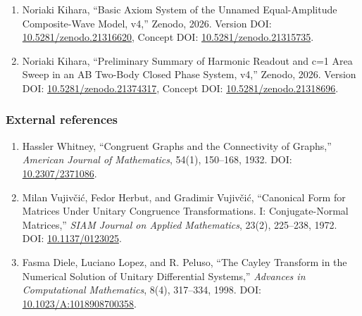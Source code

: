 \documentclass[
  10pt,
  a4paper,
]{article}
\providecommand{\tightlist}{%
  \setlength{\itemsep}{0pt}\setlength{\parskip}{0pt}}
\begin{document}
\begin{enumerate}
\def\labelenumi{\arabic{enumi}.}
\tightlist
\item
  Noriaki Kihara, ``Basic Axiom System of the Unnamed Equal-Amplitude
  Composite-Wave Model, v4,'' Zenodo, 2026. Version DOI:
  \href{https://doi.org/10.5281/zenodo.21316620}{10.5281/zenodo.21316620},
  Concept DOI:
  \href{https://doi.org/10.5281/zenodo.21315735}{10.5281/zenodo.21315735}.
\item
  Noriaki Kihara, ``Preliminary Summary of Harmonic Readout and c=1 Area
  Sweep in an AB Two-Body Closed Phase System, v4,'' Zenodo, 2026.
  Version DOI:
  \href{https://doi.org/10.5281/zenodo.21374317}{10.5281/zenodo.21374317},
  Concept DOI:
  \href{https://doi.org/10.5281/zenodo.21318696}{10.5281/zenodo.21318696}.
\end{enumerate}

\subsubsection{External references}\label{external-references}

\begin{enumerate}
\def\labelenumi{\arabic{enumi}.}
\setcounter{enumi}{2}
\tightlist
\item
  Hassler Whitney, ``Congruent Graphs and the Connectivity of Graphs,''
  \emph{American Journal of Mathematics}, 54(1), 150--168, 1932. DOI:
  \href{https://doi.org/10.2307/2371086}{10.2307/2371086}.
\item
  Milan Vujivčić, Fedor Herbut, and Gradimir Vujivčić, ``Canonical Form
  for Matrices Under Unitary Congruence Transformations. I:
  Conjugate-Normal Matrices,'' \emph{SIAM Journal on Applied
  Mathematics}, 23(2), 225--238, 1972. DOI:
  \href{https://doi.org/10.1137/0123025}{10.1137/0123025}.
\item
  Fasma Diele, Luciano Lopez, and R. Peluso, ``The Cayley Transform in
  the Numerical Solution of Unitary Differential Systems,''
  \emph{Advances in Computational Mathematics}, 8(4), 317--334, 1998.
  DOI:
  \href{https://doi.org/10.1023/A:1018908700358}{10.1023/A:1018908700358}.
\end{enumerate}
\end{document}
